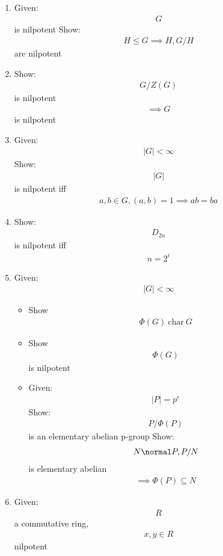 \begin{enumerate}
\def\labelenumi{\arabic{enumi}.}
\item
  Given: \begin{align*}
  G\end{align*}
   is nilpotent Show: \begin{align*}
  H \leq G \implies H, G/H\end{align*}
   are nilpotent
\item
  Show: \begin{align*}
  G/Z(G)\end{align*}
   is nilpotent \begin{align*}
  \implies G\end{align*}
   is nilpotent
\item
  Given: \begin{align*}
  |G| < \infty\end{align*}
   Show: \begin{align*}
  |G|\end{align*}
   is nilpotent iff \begin{align*}
  a,b\in G, (a,b)=1 \implies ab=ba\end{align*}
\item
  Show: \begin{align*}
  D_{2n}\end{align*}
   is nilpotent iff \begin{align*}
  n = 2^{i}\end{align*}
\item
  Given: \begin{align*}
  |G| < \infty\end{align*}

  \begin{itemize}
  \tightlist
  \item
    Show \begin{align*}
    \Phi(G)~\text{char}~ G\end{align*}
  \item
    Show \begin{align*}
    \Phi(G)\end{align*}
     is nilpotent
  \item
    Given: \begin{align*}
    |P| = p^e\end{align*}
     Show: \begin{align*}
    P / \Phi(P)\end{align*}
     is an elementary abelian p-group Show:\begin{align*}
    N \normal P, P/N\end{align*}
     is elementary abelian \begin{align*}
    \implies \Phi(P) \subseteq N\end{align*}
  \end{itemize}
\item
  Given: \begin{align*}
  R\end{align*}
   a commutative ring, \begin{align*}
  x,y \in R\end{align*}
   nilpotent


\end{enumerate}
